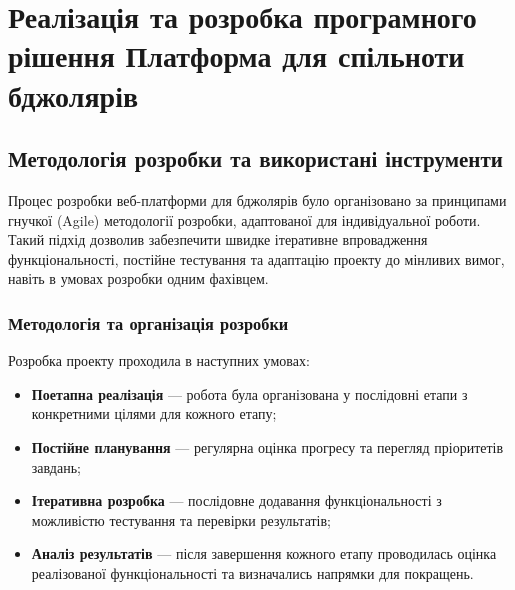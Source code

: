 \chapter{Реалізація та розробка програмного рішення {Платформа для спільноти бджолярів}}
\label{ch:implementation}

\section{Методологія розробки та використані інструменти}
\label{sec:methodology}
Процес розробки веб-платформи для бджолярів було організовано за принципами гнучкої (Agile) методології розробки, адаптованої для індивідуальної роботи. Такий підхід дозволив забезпечити швидке ітеративне впровадження функціональності, постійне тестування та адаптацію проекту до мінливих вимог, навіть в умовах розробки одним фахівцем.

\subsection{Методологія та організація розробки}
Розробка проекту проходила в наступних умовах:
\begin{itemize}
    \item \textbf{Поетапна реалізація} — робота була організована у послідовні етапи з конкретними цілями для кожного етапу;
    \item \textbf{Постійне планування} — регулярна оцінка прогресу та перегляд пріоритетів завдань;
    \item \textbf{Ітеративна розробка} — послідовне додавання функціональності з можливістю тестування та перевірки результатів;
    \item \textbf{Аналіз результатів} — після завершення кожного етапу проводилась оцінка реалізованої функціональності та визначались напрямки для покращень.
\end{itemize}

